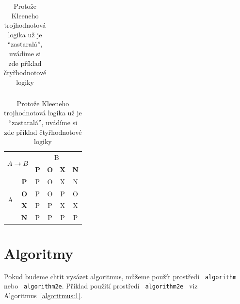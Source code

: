\documentclass[a4paper, 11pt]{article}
\begin{document}
\begin{table}[h]
\begin{tabular}[p]{|c|c|c|c|c|c|}
        \hline
    \end{tabular}
    \begin{tabular}[p]{|c|c|c|c|c|c|}
        \hline
        \multicolumn{2}{|l|}{\multirow{2}{*}{$A \rightarrow B$ }} & \multicolumn{4}{c|}{B}\\
        \cline{3-6}
        \multicolumn{2}{|l|}{}  & \textbf{P} & \textbf{O} & \textbf{X} & \textbf{N}\\
        \hline
        \multirow{4}{*}{A} & \textbf{P} & P          & O          & X          & N \\
        \cline{2-6}
                           & \textbf{O} & P          & O          & P          & O \\
        \cline{2-6}
                           & \textbf{X} & P          & P          & X          & X \\
        \cline{2-6}
                           & \textbf{N} & P          & P          & P          & P \\
        \hline
    \end{tabular}
    \caption{Protože Kleeneho trojhodnotová logika už je \enquote{zastaralá}, uvádíme si zde příklad čtyřhodnotové logiky}
    \label{table:logika}
  \end{table}


  \pagebreak

  \section{Algoritmy}
  \label{section:algoritmy}

  Pokud budeme chtít vysázet algoritmus, můžeme použít prostředí \texttt{ algorithm}\footnotemark
  \quad nebo \texttt{ algorithm2e}\footnotemark.
  Příklad použití prostředí \texttt{ algorithm2e } viz Algoritmus~\ref{algoritmus:1}.\\

\end{document}
